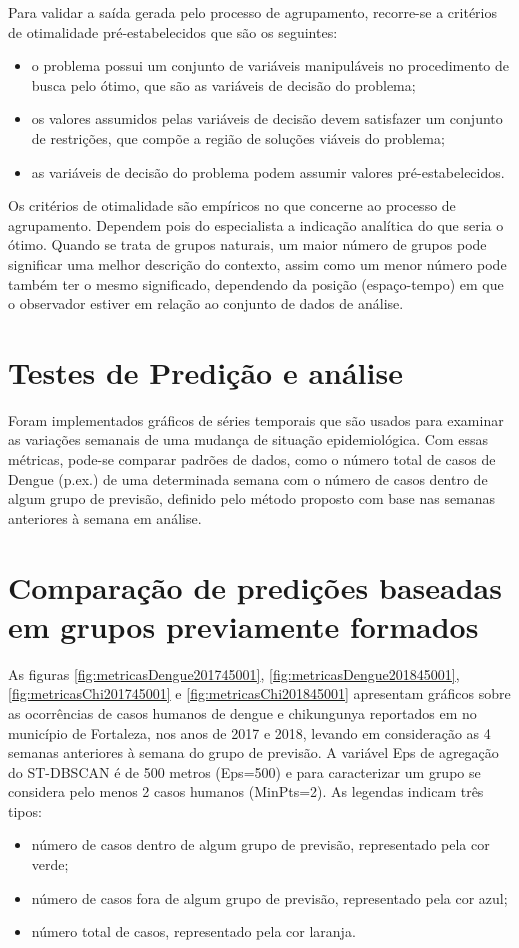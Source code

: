 Para validar a saída gerada pelo processo de agrupamento, recorre-se a critérios de otimalidade pré-estabelecidos que são os seguintes:
\begin{itemize}
    \item o problema possui um conjunto de variáveis manipuláveis no procedimento de busca pelo ótimo, que são as variáveis de decisão do problema;
    \item os valores assumidos pelas variáveis de decisão devem satisfazer um conjunto de restrições, que compõe a região de soluções viáveis do problema;
    \item as variáveis de decisão do problema podem assumir valores pré-estabelecidos.
\end{itemize}

Os critérios de otimalidade são empíricos no que concerne ao processo de agrupamento. Dependem pois do especialista a indicação analítica do que seria o ótimo. Quando se trata de grupos naturais, um maior número de grupos pode significar uma melhor descrição do contexto, assim como um menor número pode também ter o mesmo significado, dependendo da posição (espaço-tempo) em que o observador estiver em relação ao conjunto de dados de análise.

\section{Testes de Predição e análise}

Foram implementados gráficos de séries temporais que são usados para examinar as variações semanais de uma mudança de situação epidemiológica. Com essas métricas, pode-se comparar padrões de dados, como o número total de casos de Dengue (p.ex.) de uma determinada semana com o número de casos dentro de algum grupo de previsão, definido pelo método proposto com base nas semanas anteriores à semana em análise.

\section{Comparação de predições baseadas em grupos previamente formados}

As figuras \ref{fig:metricasDengue201745001}, \ref{fig:metricasDengue201845001}, \ref{fig:metricasChi201745001} e \ref{fig:metricasChi201845001} apresentam gráficos sobre as ocorrências de casos humanos de dengue e chikungunya reportados em \cite{simda} no município de Fortaleza, nos anos de 2017 e 2018, levando em consideração as 4 semanas anteriores à semana do grupo de previsão. A variável Eps de agregação do ST-DBSCAN é de 500 metros (Eps=500) e para caracterizar um grupo se considera pelo menos 2 casos humanos (MinPts=2).
As legendas indicam três tipos:
\begin{itemize}
    \item número de casos dentro de algum grupo de previsão, representado pela cor verde;
    \item número de casos fora de algum grupo de previsão, representado pela cor azul;
    \item número total de casos, representado pela cor laranja.
\end{itemize}

